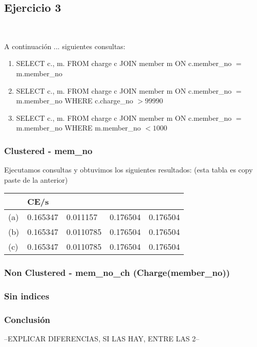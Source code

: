 \subsection{Ejercicio 3}\

A continuación ... siguientes consultas:
\begin{enumerate}[label=(\alph*)]
\item{SELECT c.\*, m.\* FROM charge c JOIN member m ON c.member\_no $=$ m.member\_no}

\item{SELECT c.\*, m.\* FROM charge c JOIN member m ON c.member\_no $=$ m.member\_no WHERE c.charge\_no $> 99990$}

\item{SELECT c.\*, m.\* FROM charge c JOIN member m ON c.member\_no $=$ m.member\_no WHERE m.member\_no $< 1000$}

\end{enumerate}

\subsubsection{Clustered - mem\_no}

Ejecutamos consultas y obtuvimos los siguientes resultados:
(esta tabla es copy paste de la anterior)
\begin{tabular}{| L | L | L | L | L |}
    \hline
     & CE/s &  &  &  \\ \hline
    (a) & 0.165347 & 0.011157 & 0.176504 & 0.176504 \\ \hline
    (b) & 0.165347 & 0.0110785 & 0.176504 & 0.176504 \\ \hline   
    (c) & 0.165347 & 0.0110785 & 0.176504 & 0.176504 \\ \hline   
\end{tabular}
	
\subsubsection{Non Clustered - mem\_no\_ch (Charge(member\_no))}
			
\subsubsection{Sin indices}			
			


\subsubsection{Conclusión}

--EXPLICAR DIFERENCIAS, SI LAS HAY, ENTRE LAS 2--